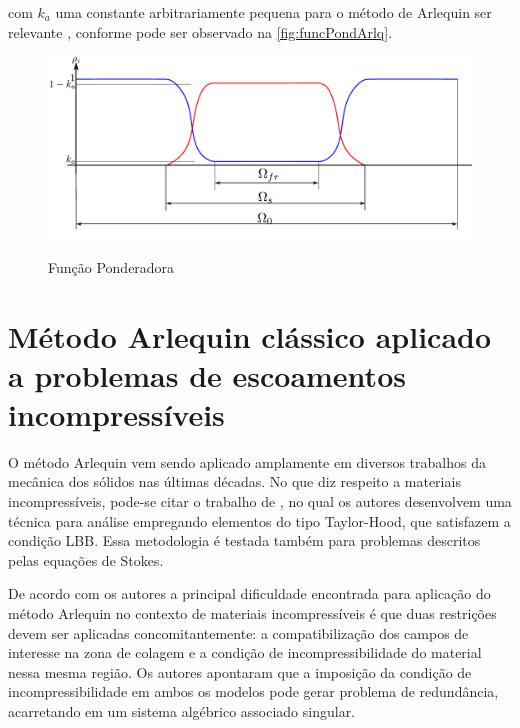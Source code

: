 \noindent com $k_a$ uma constante arbitrariamente pequena para o método de Arlequin ser relevante \cite{Dhia:2008}, conforme pode ser observado na \autoref{fig:funcPondArlq}.

\begin{figure}[!htbp]
	\caption{Função Ponderadora}
	\centering 
	\includegraphics[scale=0.6,trim=0cm 0cm 0cm 0.0cm, clip=true]{Imagens/Cap6/funcPondArlq.pdf}	
	\label{fig:funcPondArlq}
\end{figure}

\section{Método Arlequin clássico aplicado a problemas de escoamentos incompressíveis}

O método Arlequin vem sendo aplicado amplamente em diversos trabalhos da mecânica dos sólidos nas últimas décadas. No que diz respeito a materiais incompressíveis, pode-se citar o trabalho de , no qual os autores desenvolvem uma técnica para análise empregando elementos do tipo Taylor-Hood, que satisfazem a condição LBB. Essa metodologia é testada também para problemas descritos pelas equações de Stokes.

De acordo com os autores  a principal dificuldade encontrada para aplicação do método Arlequin no contexto de materiais incompressíveis é que duas restrições devem ser aplicadas concomitantemente: a compatibilização dos campos de interesse na zona de colagem e a condição de incompressibilidade do material nessa mesma região. Os autores apontaram que a imposição da condição de incompressibilidade em ambos os modelos pode gerar problema de redundância, acarretando em um sistema algébrico associado singular.

